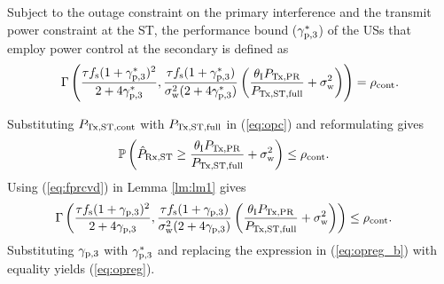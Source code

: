 \begin{coro} \label{cor:cor1}
\normalfont
Subject to the outage constraint on the primary interference and the transmit power constraint at the ST, the performance bound (${\gamma}_{\text{p,3}}^*$) of the USs that employ power control at the secondary is defined as %
\begin{align}
\Gamma\left(\frac{\tau f_{\text{s}} (1 + {\gamma}_{\text{p,3}}^*)^2}{2 + 4 {\gamma}_{\text{p,3}}^*}, \frac{\tau f_{\text{s}} (1  + {\gamma}_{\text{p,3}}^*)}{\sigma^2_{\text{w}} (2 + 4 {\gamma}_{\text{p,3}}^*)} \left( \frac{\theta_{\text{I}} P_{\text{Tx,PR}}}{P_{\text{Tx,ST,full}}} + \sigma^2_{\text{w}}  \right)  \right) = \rho_{\text{cont}}. \label{eq:opreg}  
\end{align}
\end{coro}
\begin{IEEEproof}
Substituting $P_{\text{Tx,ST,cont}}$ with $P_{\text{Tx,ST,full}}$ in (\ref{eq:opc}) and reformulating gives 
\begin{align}
\mathbb P\left( \hat{P}_{\text{Rx,ST}} \ge \frac{\theta_{\text{I}} P_{\text{Tx,PR}}}{P_{\text{Tx,ST,full}}} + \sigma^2_{\text{w}} \right) &\le \rho_{\text{cont}}. \label{eq:opreg_a} 
\end{align}
Using (\ref{eq:fprcvd}) in Lemma \ref{lm:lm1} gives
\begin{align}
\Gamma\left(\frac{\tau f_{\text{s}} (1 + {\gamma}_{\text{p,3}})^2}{2 + 4 {\gamma}_{\text{p,3}}}, \frac{\tau f_{\text{s}} (1  + {\gamma}_{\text{p,3}})}{\sigma^2_{\text{w}} (2 + 4 {\gamma}_{\text{p,3}})} \left( \frac{\theta_{\text{I}} P_{\text{Tx,PR}}}{P_{\text{Tx,ST,full}}} + \sigma^2_{\text{w}}  \right)  \right) &\le \rho_{\text{cont}}. \label{eq:opreg_b} 
\end{align}
Substituting ${\gamma}_{\text{p,3}}$ with ${\gamma}_{\text{p,3}}^*$ and replacing the expression in (\ref{eq:opreg_b}) with equality yields (\ref{eq:opreg}). 
\end{IEEEproof}
